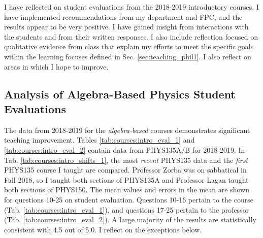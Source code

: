 \documentclass[../../main.tex]{subfiles}
\begin{document}
\label{sec:oof}

I have reflected on student evaluations from the 2018-2019 introductory courses.  I have implemented recommendations from my department and FPC, and the results appear to be very positive.  I have gained insight from interactions with the students and from their written responses.  I also include reflection focused on qualitative evidence from class that explain my efforts to meet the specific goals within the learning focuses defined in Sec. \ref{sec:teaching_phil1}.  I also reflect on areas in which I hope to improve.  \\ \hspace{0.1cm}

\subsection{Analysis of Algebra-Based Physics Student Evaluations}

The data from 2018-2019 for the \textit{algebra-based} courses demonstrates significant teaching improvement.  Tables \ref{tab:courses:intro_eval_1} and \ref{tab:courses:intro_eval_2} contain data from PHYS135A/B for 2018-2019.  In Tab. \ref{tab:courses:intro_shifts_1}, the most \textit{recent} PHYS135 data and the \textit{first} PHYS135 course I taught are compared.  Professor Zorba was on sabbatical in Fall 2018, so I taught both sections of PHYS135A and Professor Lagan taught both sections of PHYS150.  The mean values and errors in the mean are shown for questions 10-25 on student evaluation.  Questions 10-16 pertain to the course (Tab. \ref{tab:courses:intro_eval_1}), and questions 17-25 pertain to the professor (Tab. \ref{tab:courses:intro_eval_2}).  A large majority of the results are statistically consistent with 4.5 out of 5.0.  I reflect on the exceptions below. \\ \hspace{0.1cm}
\end{document}
